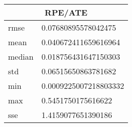 \begin{table}[!ht] 
 \centering 
 \begin{tabular}{|l|l|} \hline 
 \multicolumn{2}{|c|}{RPE/ATE} \\ \hline 
 rmse & 0.07680895578042475 \\ \hline 
mean & 0.040672411659616964 \\ \hline 
median & 0.018756431647150303 \\ \hline 
std & 0.06515650863781682 \\ \hline 
min & 0.0009225007218803332 \\ \hline 
max & 0.5451750175616622 \\ \hline 
sse & 1.4159077651390186 \\ \hline 
\end{tabular} 
 \end{table}